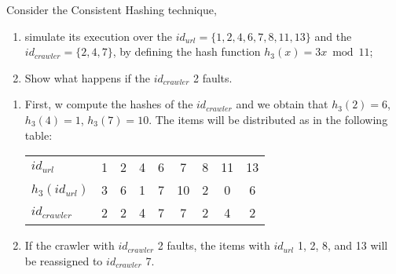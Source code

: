 \exercise

Consider the Consistent Hashing technique,
%
\begin{enumerate}

  \item simulate its execution over the $id_{url} = \{ 1, 2, 4, 6, 7, 8, 11,
  13 \}$ and the $id_{crawler} = \{ 2, 4, 7 \}$, by defining the hash function
  $h_3(x) = 3x \bmod 11$;

  \item Show what happens if the $id_{crawler}$ 2 faults.

\end{enumerate}

\solution

\begin{enumerate}

  \item First, w compute the hashes of the $id_{crawler}$ and we obtain that
  $h_3(2) = 6$, $h_3(4) = 1$, $h_3(7) = 10$. The items will be distributed as in
  the following table:
  \begin{table}[h]
    \centering
    \begin{tabular}{l|c|c|c|c|c|c|c|c}
      $id_{url}$      & 1 & 2 & 4 & 6 & 7 & 8 & 11 & 13 \\
      $h_3(id_{url})$ & 3 & 6 & 1 & 7 & 10 & 2 & 0 & 6 \\ \hline
      $id_{crawler}$  & 2 & 2 & 4 & 7 & 7 & 2 & 4 & 2 \\
    \end{tabular}
  \end{table}

  \item If the crawler with $id_{crawler}$ 2 faults, the items with $id_{url}$
  1, 2, 8, and 13 will be reassigned to $id_{crawler}$ 7.

\end{enumerate}

